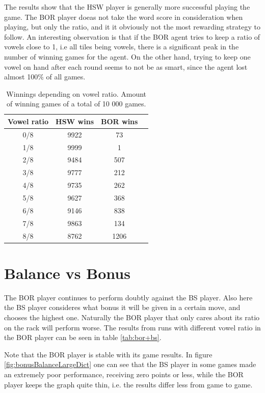\documentclass[a4paper, 12pt]{report}
\begin{document}
The results show that the HSW player is generally more successful playing the game. The BOR player doeas not take the word score in consideration when playing, but only the ratio, and it it obviously not the most rewarding strategy to follow. An interesting observation is that if the BOR agent tries to keep a ratio of vowels close to 1, i.e all tiles being vowels, there is a significant peak in the number of winning games for the agent. On the other hand, trying to keep one vowel on hand after each round seems to not be as smart, since the agent lost almost 100\% of all games.

\begin{table}[h]
\centering
    \begin{tabular}{ | c | c | c | p{5cm} |}
    \hline
   	Vowel ratio & HSW wins & BOR wins \\ \hline
	0/8 & 9922 & 73 \\ \hline
    	1/8 & 9999  & 1 \\ \hline
    	2/8 & 9484 & 507 \\ \hline
    	3/8 & 9777 & 212 \\ \hline
	4/8 & 9735 & 262 \\ \hline
	5/8 & 9627 & 368 \\ \hline
	6/8 & 9146 & 838 \\ \hline
	7/8 & 9863 & 134 \\ \hline
	8/8 & 8762 & 1206 \\ \hline
    \end{tabular}
\caption{Winnings depending on vowel ratio. Amount of winning games of a total of 10 000 games.}
\label{tab:bor+hsw}
\end{table}


\section{Balance vs Bonus}
\label{sec:balanceBonus}
The BOR player continues to perform doubtly against the BS player. Also here the BS player consideres what bonus it will be given in a certain move, and chooses the highest one. Naturally the BOR player that only cares about its ratio on the rack will perform worse. The results from runs with different vowel ratio in the BOR player can be seen in table \ref{tab:bor+bs}.

Note that the BOR player is stable with its game results. In figure \ref{fig:bonusBalanceLargeDict} one can see that the BS player in some games made an extremely poor performance, receiving zero points or less, while the BOR player keeps the graph quite thin, i.e. the results differ less from game to game.
\end{document}
